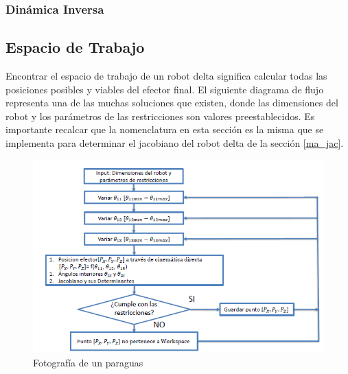 \begin{algorithm}
\end{algorithm}

        \newpage

\subsubsection{Dinámica Inversa}
        \newpage

        
    \subsection{Espacio de Trabajo}
     Encontrar el espacio de trabajo de un robot delta significa calcular todas las posiciones posibles y viables del efector final. El siguiente diagrama de flujo representa una de las muchas soluciones que existen, donde las dimensiones del robot y los parámetros de las restricciones son valores preestablecidos. Es importante recalcar que la nomenclatura en esta sección es la misma que se implementa para determinar el jacobiano del robot delta de la sección \ref{ma_jac}.  
    
             \begin{figure}[htb]
                \centering
                \includegraphics[width=1\linewidth]{Main/Chapter6/Images6/cap6_ws_2.png}
                \caption{Fotografía de un paraguas}
                \label{f:Cap6_ws_2}
            \end{figure}  

